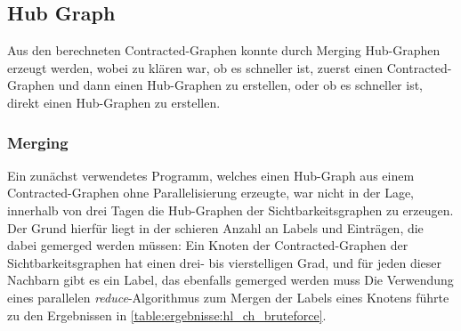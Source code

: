 \subsection{Hub Graph}

Aus den berechneten Contracted-Graphen konnte durch Merging Hub-Graphen erzeugt werden, wobei zu klären war, ob es schneller ist, zuerst einen Contracted-Graphen und dann einen Hub-Graphen zu erstellen, oder ob es schneller ist, direkt einen Hub-Graphen zu erstellen.

\subsubsection{Merging}

Ein zunächst verwendetes Programm, welches einen Hub-Graph aus einem Contracted-Graphen ohne Parallelisierung erzeugte, war nicht in der Lage, innerhalb von drei Tagen die Hub-Graphen der Sichtbarkeitsgraphen zu erzeugen.
Der Grund hierfür liegt in der schieren Anzahl an Labels und Einträgen, die dabei gemerged werden müssen:
Ein Knoten der Contracted-Graphen der Sichtbarkeitsgraphen hat einen drei- bis vierstelligen Grad, und für jeden dieser Nachbarn gibt es ein Label, das ebenfalls gemerged werden muss
Die Verwendung eines parallelen \emph{reduce}-Algorithmus zum Mergen der Labels eines Knotens führte zu den Ergebnissen in \autoref{table:ergebnisse:hl_ch_bruteforce}.

